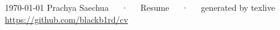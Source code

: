 \documentclass[11pt, a4paper]{awesome-cv}
\begin{document}
\makecvheader[C]

\makecvfooter
  {\today}
  {Prachya Saechua~~~·~~~Resume~~~·~~~generated by texlive \href{https://github.com/blackb1rd/cv}{https://github.com/blackb1rd/cv}}
  {\thepage}









\end{document}
